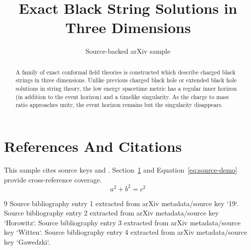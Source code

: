 \documentclass[11pt]{article}
\title{Exact Black String Solutions in Three Dimensions}
\author{Source-backed arXiv sample}
\date{}
\begin{document}
\maketitle
\begin{abstract}
A family of exact conformal field theories is constructed which describe charged black strings in three dimensions. Unlike previous charged black hole or extended black hole solutions in string theory, the low energy spacetime metric has a regular inner horizon (in addition to the event horizon) and a timelike singularity. As the charge to mass ratio approaches unity, the event horizon remains but the singularity disappears.
\end{abstract}
\section{References And Citations}
\label{sec:refs}
This sample cites source keys \cite{19} and \cite{Horowitz}. Section~\ref{sec:refs} and Equation~\ref{eq:source-demo} provide cross-reference coverage.
\begin{equation}
\label{eq:source-demo}
a^2 + b^2 = c^2
\end{equation}
\begin{thebibliography}{9}
 Source bibliography entry 1 extracted from arXiv metadata/source key `19`.
 Source bibliography entry 2 extracted from arXiv metadata/source key `Horowitz`.
 Source bibliography entry 3 extracted from arXiv metadata/source key `Witten`.
 Source bibliography entry 4 extracted from arXiv metadata/source key `Gawedzki`.
\end{thebibliography}
\end{document}
